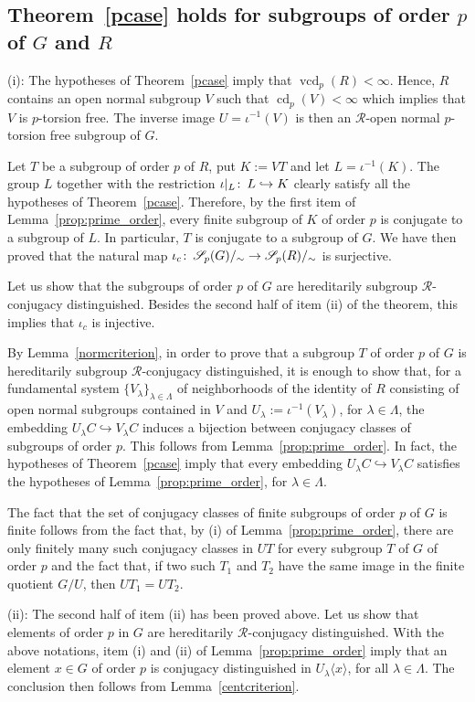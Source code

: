 \documentclass[12pt,twoside]{amsart}
\newcommand\la{\langle}
\newcommand\ra{\rangle}
\newcommand\cR{{\mathcal R}}
\newcommand\hookra{\hookrightarrow}
\newcommand\cS{{\mathscr S}}
\newcommand\ld{\lambda}
\newcommand\Ld{\Lambda}
\def\co{\colon\thinspace}
\newcommand\cd{\operatorname{cd}}
\newcommand\vcd{\operatorname{vcd}}
\theoremstyle{definition}
\begin{document}
\subsection{Theorem~\ref{pcase} holds for subgroups of order $p$ of $G$ and $R$}\label{orderp}
(i): The hypotheses of Theorem~\ref{pcase} imply that $\vcd_p(R)<\infty$. Hence, $R$ contains an open normal subgroup $V$ such that 
$\cd_p(V)<\infty$ which implies that $V$ is $p$-torsion free. The inverse image $U=\iota^{-1}(V)$ is then an $\cR$-open normal
$p$-torsion free subgroup of $G$. 

Let $T$ be a subgroup of order $p$ of $R$, put $K:=V T$ and let $L=\iota^{-1}(K)$.
The group $L$ together with the restriction $\iota|_L\co L\hookra K$ clearly satisfy all the hypotheses of Theorem~\ref{pcase}.
Therefore, by the first item of Lemma~\ref{prop:prime_order}, every finite subgroup of $K$ of order $p$ is conjugate to a subgroup of $L$.
In particular, $T$ is conjugate to a subgroup of $G$. We have then proved that the natural map $\iota_c\co\cS_p(G)/_\sim\to\cS_p(R)/_\sim$ is surjective.

Let us show that the subgroups of order $p$ of $G$ are hereditarily subgroup $\cR$-conjugacy distinguished. 
Besides the second half of item (ii) of the theorem, this implies that $\iota_c$ is injective. 

By Lemma~\ref{normcriterion}, in order to prove that a subgroup $T$ of order $p$ of $G$ is hereditarily subgroup $\cR$-conjugacy distinguished,
it is enough to show that, for a fundamental system $\{V_\ld\}_{\ld\in\Ld}$ of neighborhoods of the identity of $R$ consisting of open normal 
subgroups contained in $V$ and $U_\ld:=\iota^{-1}(V_\ld)$, for $\ld\in\Ld$, the embedding $U_\ld C\hookra V_\ld C$ induces a 
bijection between conjugacy classes of subgroups of order $p$. This follows from Lemma~\ref{prop:prime_order}. In fact, the hypotheses
of Theorem~\ref{pcase} imply that every embedding $U_\ld C\hookra V_\ld C$ satisfies the hypotheses of Lemma~\ref{prop:prime_order},
for $\ld\in\Ld$.

The fact that the set of conjugacy classes of finite subgroups of order $p$ of $G$ is finite follows from the fact that, by (i) of Lemma~\ref{prop:prime_order}, 
there are only finitely many such conjugacy classes in $UT$ for every subgroup $T$ of $G$ of order $p$ and the fact that, if two such 
$T_1$ and $T_2$ have the same image in the finite quotient $G/U$, then $UT_1=UT_2$.
\smallskip

\noindent
(ii): The second half of item (ii) has been proved above. Let us show that elements of order $p$ in $G$ are hereditarily $\cR$-conjugacy distinguished.
With the above notations, item (i) and (ii) of Lemma~\ref{prop:prime_order} imply that an element $x\in G$ of order $p$ is conjugacy
distinguished in $U_\ld\la x\ra$, for all $\ld\in\Ld$. The conclusion then follows from Lemma~\ref{centcriterion}.
\smallskip
\end{document}
